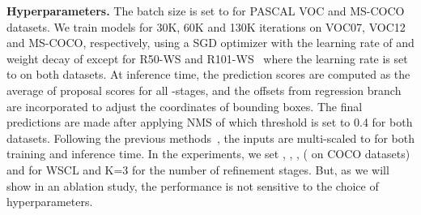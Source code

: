 \documentclass[runningheads]{llncs}
\begin{document}
\noindent\textbf{Hyperparameters.}
The batch size is set to  for PASCAL VOC and MS-COCO datasets. We train models for 30K, 60K and 130K iterations on VOC07, VOC12 and MS-COCO, respectively, using a SGD optimizer with the learning rate of  and weight decay of  except for R50-WS and R101-WS~\cite{shen2020enabling} where the learning rate is set to  on both datasets.
At inference time, the prediction scores are computed as the average of proposal scores for all -stages, and the offsets from regression branch are incorporated to adjust the coordinates of bounding boxes.
The final predictions are made after applying NMS of which threshold is set to 0.4 for both datasets.
Following the previous methods~\cite{ren2020instance,Tang_2017_CVPR,huang2020comprehensive}, the inputs are multi-scaled to  for both training and inference time.
In the experiments, we set , , ,  ( on COCO datasets) and  for WSCL and K=3 for the number of refinement stages. But, as we will show in an ablation study, the performance is not sensitive to the choice of hyperparameters.
\end{document}
